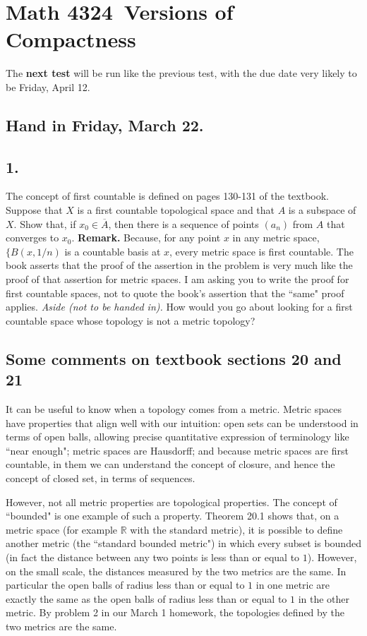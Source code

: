 \documentclass{amsart}
\theoremstyle{plain}
\theoremstyle{definition}
\theoremstyle{remark}
\begin{document}
\section*{Math 4324\  Versions of Compactness } 

\vspace{.15in}
The {\bf next test} will be run like the previous test, with the due date very likely to be Friday, April 12. 

\subsection*{Hand in Friday, March 22.} 


\vspace{.15in}
\noindent
\subsection*{1.} The concept of first countable is defined on pages 130-131 of the textbook. Suppose that $X$ is a first countable topological space and that $A$ is a subspace of $X$. Show that, if $x_0\in \overline{A}$, then there is a sequence of points $(a_n)$ from $A$ that converges to $x_0$. {\bf Remark.} Because, for any point $x$ in any metric space, $\{ B(x, 1/n)$ is a countable basis at $x$, every metric space is first countable. The book asserts that the proof of the assertion in the problem is very much like the proof of that assertion for metric spaces. I am asking you to write the proof for first countable spaces, not to quote the book's assertion that the ``same" proof applies. {\it Aside (not to be handed in).} How would you go about looking for a first countable space whose topology is not a metric topology? 

\vspace{.15in}
\subsection*{Some comments on textbook sections 20 and 21} It can be useful to know when a topology comes from a metric. Metric spaces have properties that align well with our intuition: open sets can be understood in terms of open balls, allowing precise quantitative expression of terminology like ``near enough"; metric spaces are Hausdorff; and because metric spaces are first countable, in them we can understand the concept of closure, and hence the concept of closed set, in terms of sequences. 

However, not all metric properties are topological properties. The concept of ``bounded" is one example of such a property. Theorem 20.1 shows that, on a metric space (for example $\mathbb R$ with the standard metric), it is possible to define another metric (the ``standard bounded metric") in which every subset is bounded (in fact the distance between any two points is less than or equal to $1$). However, on the small scale, the distances measured by the two metrics are the same. In particular the open balls of radius less than or equal to $1$ in one metric are exactly the same as the open balls of radius less than or equal to $1$ in the other metric. By problem 2 in our March 1 homework, the topologies defined by the two metrics are the same. 
\end{document}
